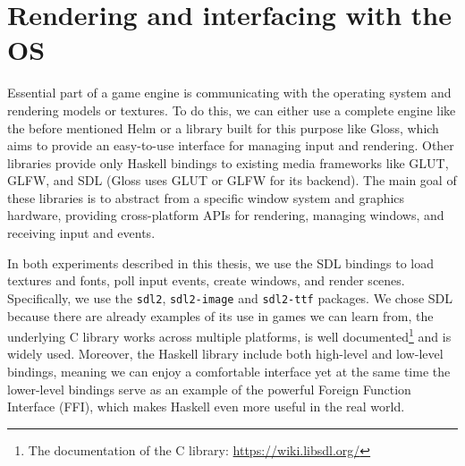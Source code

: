 \documentclass[
  digital, %
  color,   %
  table,   %
  oneside, %
  lof,     %
  lot,     %
]{fithesis3}
\newcommand{\packagename}{\texttt}
\begin{document}
\section{Rendering and interfacing with the OS}
\label{sect:aboutsdl}
Essential part of a game engine is communicating with the operating system
and rendering models or textures. To do this, we can
either use a complete engine like the before mentioned Helm or
a library built for this purpose like Gloss\cite{glossrepo}, which aims to provide an easy-to-use
interface for managing input and rendering. Other libraries
provide only Haskell bindings to existing media frameworks like GLUT, GLFW, and SDL
(Gloss uses GLUT or GLFW for its backend). The main goal of these libraries is
to abstract from a specific window system and graphics hardware, providing
cross-platform APIs for rendering, managing windows, and receiving input and events.

In both experiments described in this thesis, we use the SDL bindings
to load textures and fonts, poll input events, create windows, and render scenes.
Specifically, we use the \packagename{sdl2}, \packagename{sdl2-image}
and \packagename{sdl2-ttf} packages. We chose SDL because there are already
examples of its use in games we can learn from,
the underlying C library works across multiple platforms,
is well documented\footnote{
    The documentation of the C library: \url{https://wiki.libsdl.org/}
} and is widely used. Moreover, the Haskell library
include both high-level and low-level bindings, meaning we can
enjoy a comfortable interface yet at the same time the
lower-level bindings serve as an example of
the powerful Foreign Function Interface (FFI), which
makes Haskell even more useful in the real world.
\end{document}
